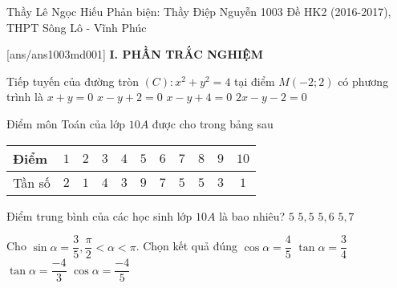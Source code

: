 \begin{name}
{Thầy Lê Ngọc Hiếu \newline  Phản biện: Thầy Điệp Nguyễn}
{1003 Đề HK2 (2016-2017), THPT Sông Lô - Vĩnh Phúc}%
	\end{name}
	\setcounter{ex}{0}\setcounter{bt}{0}
	[ans/ans1003md001]
\noindent\textbf{I. PHẦN TRẮC NGHIỆM}
\begin{ex}%
	Tiếp tuyến của đường tròn $(C): x^2 + y^2 =4$ tại điểm $M(-2;2)$ có phương trình là
	\choice
	{$x+y=0$}
	{$x-y+2=0$}
	{\True $x-y+4=0$}
	{$2x-y-2=0$}
\end{ex}
\begin{ex}%
Điểm môn Toán của lớp $10A$ được cho trong bảng sau
\begin{center}
\begin{tabular}{|l|c|c|c|c|c|c|c|c|c|c|}
\hline
Điểm&$1$&$2$&$3$&$4$&$5$&$6$&$7$&$8$&$9$&$10$\\
\hline
Tần số&$2$&$1$&$4$&$3$&$9$&$7$&$5$&$5$&$3$&$1$\\
\hline
\end{tabular}
\end{center}
Điểm trung bình của các học sinh lớp $10A$ là bao nhiêu?
\choice
{$5$}
{$5,5$}
{$5,6$}
{\True $5,7$}
\end{ex}
\begin{ex}%
Cho $\sin \alpha = \dfrac{3}{5}, \dfrac{\pi}{2}< \alpha < \pi$. Chọn kết quả đúng
\choice
{$\cos \alpha = \dfrac{4}{5}$}
{$\tan \alpha = \dfrac{3}{4}$}
{$\tan \alpha = \dfrac{-4}{3}$}
{\True $\cos \alpha = \dfrac{-4}{5}$}
\end{ex}
